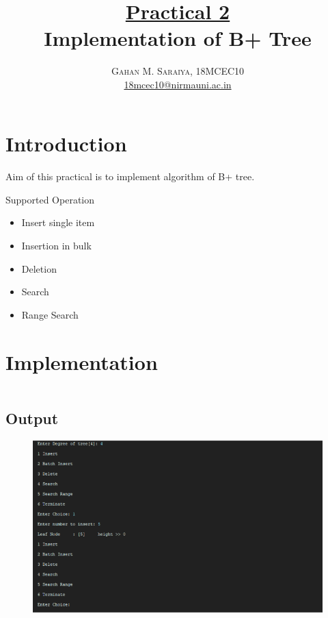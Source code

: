 \documentclass[paper=letter, fontsize=12pt]{article}
\title{\vspace{-15mm}\fontsize{24pt}{10pt}\selectfont\textbf{
		\underline{Practical 2}\\Implementation of B+ Tree}} %
\author{\large{\textsc{
		Gahan M. Saraiya, 18MCEC10 }}\\[2mm]
\normalsize \href{mailto:18mcec10@nirmauni.ac.in}{18mcec10@nirmauni.ac.in}\\[2mm] %
}
\date{}
\begin{document}
\maketitle %
\thispagestyle{fancy} %

\newcommand*\tick{\item[\Checkmark]}
\newcommand*\arrow{\item[$\Rightarrow$]}
\newcommand*\fail{\item[\XSolidBrush]}

\section{Introduction}
\paragraph{}
Aim of this practical is to implement algorithm of B+ tree.

Supported Operation
\begin{itemize}
	\item Insert single item
	\item Insertion in bulk
	\item Deletion
	\item Search
	\item Range Search
\end{itemize}

\section{Implementation}

\inputminted[frame=lines, breaklines, linenos]{python}{../btree_implementation/bPlusTree.py}

\subsection*{Output}
\begin{figure}[H]
	\includegraphics*[width=440px]{01.png}
\end{figure}
\end{document}
